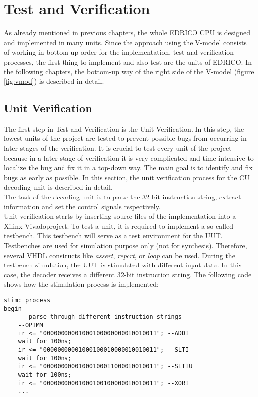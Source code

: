 \chapter{Test and Verification}
As already mentioned in previous chapters, the whole EDRICO CPU is designed and implemented in many units. Since the approach using the V-model consists of working in bottom-up order for the implementation, test and verification processes, the first thing to implement and also test are the units of EDRICO. In the following chapters, the bottom-up way of the right side of the V-model (figure \ref{fig:vmod}) is described in detail.
\section{Unit Verification}
The first step in Test and Verification is the Unit Verification. In this step, the lowest units of the project are tested to prevent possible bugs from occurring in later stages of the verification. It is crucial to test every unit of the project because in a later stage of verification it is very complicated and time intensive to localize the bug and fix it in a top-down way. The main goal is to identify and fix bugs as early as possible. In this section, the unit verification process for the CU decoding unit is described in detail.\\
The task of the decoding unit is to parse the 32-bit instruction string, extract information and set the control signals respectively.\\
Unit verification starts by inserting source files of the implementation into a Xilinx Vivado\textcopyright  project. To test a unit, it is required to implement a so called testbench. This testbench will serve as a test environment for the \ac{UUT}. Testbenches are used for simulation purpose only (not for synthesis). Therefore, several VHDL constructs like \textit{assert}, \textit{report}, or \textit{loop} can be used. During the testbench simulation, the UUT is stimulated with different input data. In this case, the decoder receives a different 32-bit instruction string. The following code shows how the stimulation process is implemented:
\clearpage
\begin{lstlisting}[style=vhdl, caption=CU testbench stimulation process]
stim: process
begin
	-- parse through different instruction strings
	--OPIMM
	ir <= "00000000001000100000000010010011"; --ADDI
	wait for 100ns;
	ir <= "00000000001000100010000010010011"; --SLTI
	wait for 100ns;
	ir <= "00000000001000100011000010010011"; --SLTIU
	wait for 100ns;
	ir <= "00000000001000100100000010010011"; --XORI
	...
\end{lstlisting}
